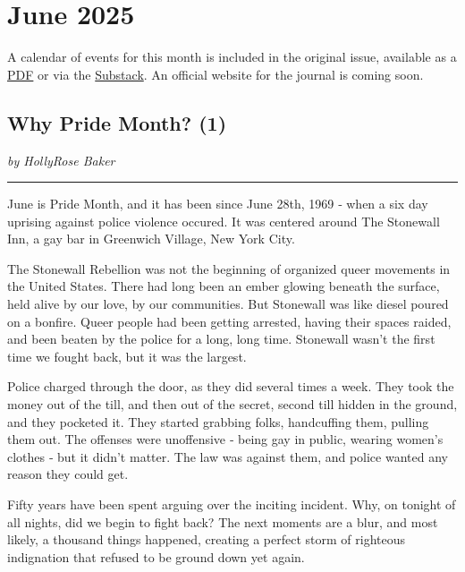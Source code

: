 \documentclass[
]{book}
\begin{document}
\chapter*{June 2025}\label{june-2025}

A calendar of events for this month is included in the original issue, available as a \href{https://mobilebaydsa.org/newsletter/june2025.pdf}{PDF} or via the \href{https://viktorzaltys.substack.com/p/mobile-bay-labor-journal-50c}{Substack}. An official website for the journal is coming soon.

\section*{Why Pride Month? (1)}\label{why-pride-month-1}

\emph{by HollyRose Baker}

\begin{center}\rule{0.5\linewidth}{0.5pt}\end{center}

June is Pride Month, and it has been since June 28th, 1969 ‑ when a six day uprising against police violence occured. It was centered around The Stonewall Inn, a gay bar in Greenwich Village, New York City.

The Stonewall Rebellion was not the beginning of organized queer movements in the United States. There had long been an ember glowing beneath the surface, held alive by our love, by our communities. But Stonewall was like diesel poured on a bonfire. Queer people had been getting arrested, having their spaces raided, and been beaten by the police for a long, long time. Stonewall wasn't the first time we fought back, but it was the largest.

Police charged through the door, as they did several times a week. They took the money out of the till, and then out of the secret, second till hidden in the ground, and they pocketed it. They started grabbing folks, handcuffing them, pulling them out. The offenses were unoffensive ‑ being gay in public, wearing women's clothes ‑ but it didn't matter. The law was against them, and police wanted any reason they could get.

Fifty years have been spent arguing over the inciting incident. Why, on tonight of all nights, did we begin to fight back? The next moments are a blur, and most likely, a thousand things happened, creating a perfect storm of righteous indignation that refused to be ground down yet again.
\end{document}
